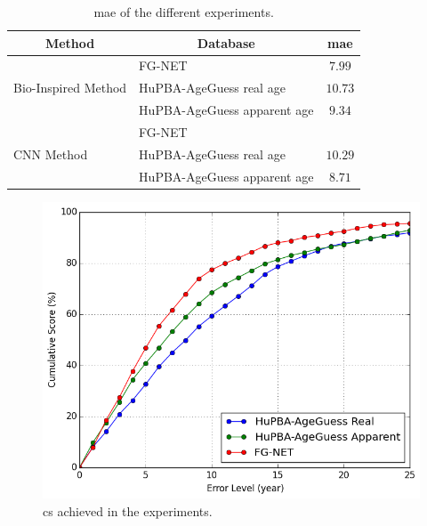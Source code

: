 \begin{table}[!h]
	\centering
	\begin{tabular}{|l|l|c|}
		\hline
		\multicolumn{1}{|c|}{\textbf{Method}} & 
		\multicolumn{1}{|c|}{\textbf{Database}} & \textbf{\gls{mae}}\\ \hline\hline%
		\multirow{3}{*}{Bio-Inspired Method} & FG-NET & $7.99$\\ 		\cline{2-3} 
				& HuPBA-AgeGuess real age & $10.73$\\ \cline{2-3}
				& HuPBA-AgeGuess apparent age & $9.34$\\ \hline\hline%
		\multirow{3}{*}{CNN Method} & FG-NET & \\ \cline{2-3}
				& HuPBA-AgeGuess real age & $10.29$\\ \cline{2-3}
			
				& HuPBA-AgeGuess apparent age & $8.71$ \\ \hline
		
		
	\end{tabular}
	\caption{\gls{mae} of the different experiments.}
	\label{tab:results}
\end{table}

\begin{figure}[!h]
	\centering
	\includegraphics[width=\textwidth]{figures/cum_score}
	\caption{\gls{cs} achieved in the experiments.}
	\label{fig:cumS}
\end{figure}
